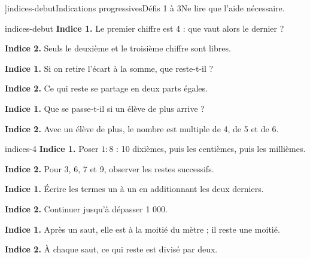 \editionPage[\pdfbookmark[0]{Indications des défis}{bm-indices-debut-parent}]{indices-debut}{Indications progressives}{Défis 1 à 3}{Ne lire que l’aide nécessaire.}
\begin{blocEdition}{indices-debut}
\textbf{Indice 1.} Le premier chiffre est 4 : que vaut alors le dernier ?\par\medskip\textbf{Indice 2.} Seuls le deuxième et le troisième chiffre sont libres.\par
{}\textbf{Indice 1.} Si on retire l’écart à la somme, que reste-t-il ?\par\medskip\textbf{Indice 2.} Ce qui reste se partage en deux parts égales.\par
{}\textbf{Indice 1.} Que se passe-t-il si un élève de plus arrive ?\par\medskip\textbf{Indice 2.} Avec un élève de plus, le nombre est multiple de 4, de 5 et de 6.\par

\end{blocEdition}
\begin{blocEdition}{indices-4}
\textbf{Indice 1.} Poser $1:8$ : 10 dixièmes, puis les centièmes, puis les millièmes.\par\medskip\textbf{Indice 2.} Pour 3, 6, 7 et 9, observer les restes successifs.\par
{}\textbf{Indice 1.} Écrire les termes un à un en additionnant les deux derniers.\par\medskip\textbf{Indice 2.} Continuer jusqu’à dépasser 1 000.\par
{}\textbf{Indice 1.} Après un saut, elle est à la moitié du mètre ; il reste une moitié.\par\medskip\textbf{Indice 2.} À chaque saut, ce qui reste est divisé par deux.\par

\end{blocEdition}

